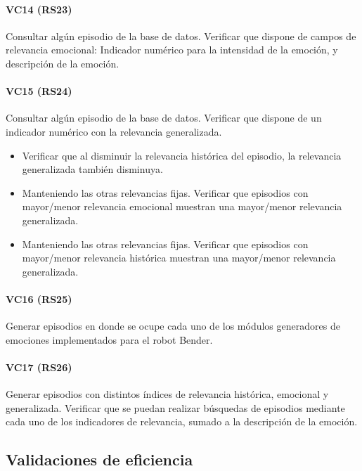 \paragraph{VC14 (RS23)}
Consultar algún episodio de la base de datos. Verificar que dispone de campos de relevancia emocional: Indicador numérico para la intensidad de la emoción, y descripción de la emoción.

\paragraph{VC15 (RS24)}
Consultar algún episodio de la base de datos. Verificar que dispone de un indicador numérico con la relevancia generalizada.
\begin{itemize}
\item Verificar que al disminuir la relevancia histórica del episodio, la relevancia generalizada también disminuya.
\item Manteniendo las otras relevancias fijas. Verificar que episodios con mayor/menor relevancia emocional muestran una mayor/menor relevancia generalizada.
\item Manteniendo las otras relevancias fijas. Verificar que episodios con mayor/menor relevancia histórica muestran una mayor/menor relevancia generalizada.
\end{itemize}

\paragraph{VC16 (RS25)}
Generar episodios en donde se ocupe cada uno de los módulos generadores de emociones implementados para el robot Bender.

\paragraph{VC17 (RS26)}
Generar episodios con distintos índices de relevancia histórica, emocional y generalizada. Verificar que se puedan realizar búsquedas de episodios mediante cada uno de los indicadores de relevancia, sumado a la descripción de la emoción.

\subsection{Validaciones de eficiencia}



